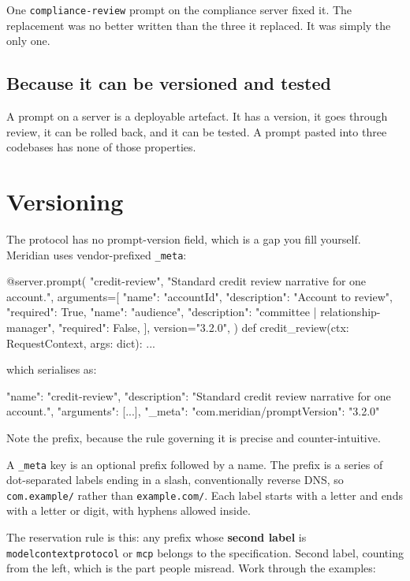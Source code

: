 One \texttt{compliance-review} prompt on the compliance server fixed it. The replacement was no better written than the three it replaced. It was simply
the only one.

\subsection{Because it can be versioned and tested}

A prompt on a server is a deployable artefact. It has a version, it goes through
review, it can be rolled back, and it can be tested. A prompt pasted into three
codebases has none of those properties.

\section{Versioning}

The protocol has no prompt-version field, which is a gap you fill yourself.
Meridian uses vendor-prefixed \texttt{\_meta}:

\begin{py}
@server.prompt(
    "credit-review",
    "Standard credit review narrative for one account.",
    arguments=[
        {"name": "accountId", "description": "Account to review",
         "required": True},
        {"name": "audience", "description": "committee | relationship-manager",
         "required": False},
    ],
    version="3.2.0",
)
def credit_review(ctx: RequestContext, args: dict):
    ...
\end{py}

which serialises as:

\begin{wire}
{
  "name": "credit-review",
  "description": "Standard credit review narrative for one account.",
  "arguments": [...],
  "_meta": { "com.meridian/promptVersion": "3.2.0" }
}
\end{wire}

Note the prefix, because the rule governing it is precise and counter-intuitive.

A \texttt{\_meta} key is an optional prefix followed by a name. The prefix is a
series of dot-separated labels ending in a slash, conventionally reverse DNS, so
\texttt{com.example/} rather than \texttt{example.com/}. Each label starts with
a letter and ends with a letter or digit, with hyphens allowed inside.

The reservation rule is this: any prefix whose \textbf{second label} is
\texttt{modelcontextprotocol} or \texttt{mcp} belongs to the specification.
Second label, counting from the left, which is the part people misread. Work
through the examples:

